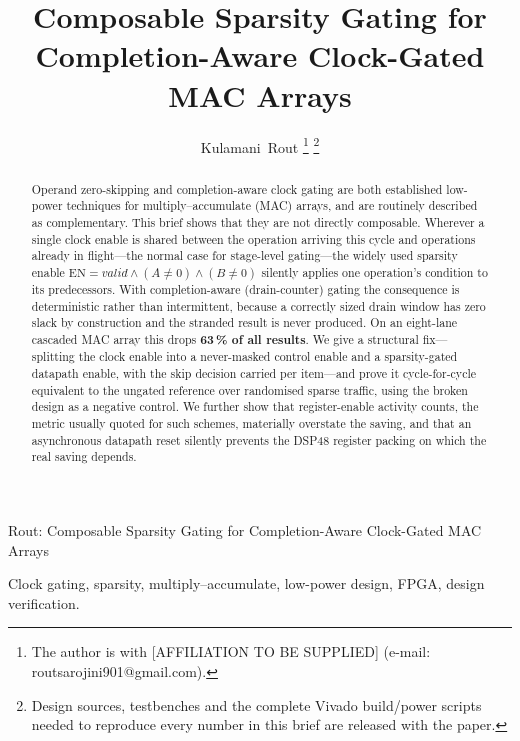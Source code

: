 \documentclass[journal,twocolumn]{IEEEtran}
\begin{document}
\title{Composable Sparsity Gating for\\Completion-Aware Clock-Gated MAC Arrays}

\author{Kulamani~Rout%
\thanks{The author is with [AFFILIATION TO BE SUPPLIED]
(e-mail: routsarojini901@gmail.com).}
\thanks{Design sources, testbenches and the complete Vivado build/power
scripts needed to reproduce every number in this brief are released with
the paper.}}

%
{Rout: Composable Sparsity Gating for Completion-Aware Clock-Gated MAC Arrays}

\maketitle

\begin{abstract}
Operand zero-skipping and completion-aware clock gating are both established
low-power techniques for multiply--accumulate (MAC) arrays, and are routinely
described as complementary. This brief shows that they are not directly
composable. Wherever a single clock enable is shared between the operation arriving this
cycle and operations already in flight---the normal case for stage-level
gating---the widely used sparsity enable
$\mathrm{EN}=\mathit{valid}\wedge(A\neq0)\wedge(B\neq0)$ silently applies one operation's
condition to its predecessors. With completion-aware (drain-counter) gating
the consequence is deterministic rather than intermittent, because a correctly
sized drain window has zero slack by construction and the stranded result is
never produced. On an
eight-lane cascaded MAC array this drops \textbf{63\,\% of all results}. We
give a structural fix---splitting the clock enable into a never-masked control
enable and a sparsity-gated datapath enable, with the skip decision carried
per item---and prove it cycle-for-cycle equivalent to the ungated reference
over randomised sparse traffic, using the broken design as a negative control.
We further show that register-enable activity counts, the metric usually
quoted for such schemes, materially overstate the saving, and that an
asynchronous datapath reset silently prevents the DSP48 register packing on
which the real saving depends.
\end{abstract}

\begin{IEEEkeywords}
Clock gating, sparsity, multiply--accumulate, low-power design, FPGA,
design verification.
\end{IEEEkeywords}
\end{document}
